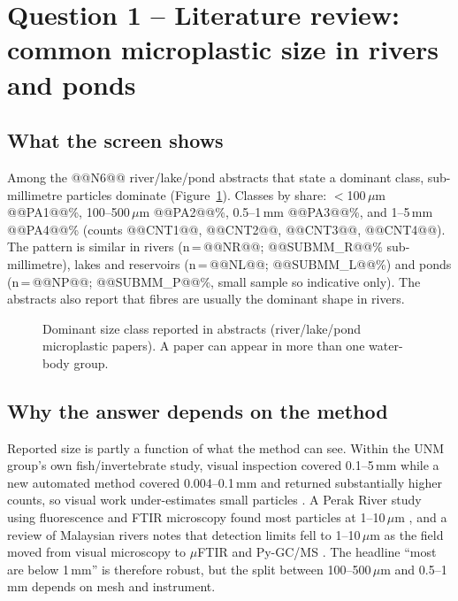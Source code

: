 \documentclass[11pt,a4paper]{article}
\newcommand{\um}{\,\ensuremath{\mu}m}
\begin{document}
\section{Question 1 -- Literature review: common microplastic size in rivers and ponds}
\subsection{What the screen shows}
Among the @@N6@@ river/lake/pond abstracts that state a dominant class, sub-millimetre particles dominate (Figure~\ref{fig:bars}). Classes by share: $<$100\um{} @@PA1@@\%, 100--500\um{} @@PA2@@\%, 0.5--1\,mm @@PA3@@\%, and 1--5\,mm @@PA4@@\% (counts @@CNT1@@, @@CNT2@@, @@CNT3@@, @@CNT4@@). The pattern is similar in rivers (n\,=\,@@NR@@; @@SUBMM_R@@\% sub-millimetre), lakes and reservoirs (n\,=\,@@NL@@; @@SUBMM_L@@\%) and ponds (n\,=\,@@NP@@; @@SUBMM_P@@\%, small sample so indicative only). The abstracts also report that fibres are usually the dominant shape in rivers.

\begin{figure}[H]\centering
{}
\caption{Dominant size class reported in abstracts (river/lake/pond microplastic papers). A paper can appear in more than one water-body group.}\label{fig:bars}
\end{figure}

\subsection{Why the answer depends on the method}
Reported size is partly a function of what the method can see. Within the UNM group's own fish/invertebrate study, visual inspection covered 0.1--5\,mm while a new automated method covered 0.004--0.1\,mm and returned substantially higher counts, so visual work under-estimates small particles \cite{ng24}. A Perak River study using fluorescence and FTIR microscopy found most particles at 1--10\um{} \cite{hassan25}, and a review of Malaysian rivers notes that detection limits fell to 1--10\um{} as the field moved from visual microscopy to $\mu$FTIR and Py-GC/MS \cite{bouida26}. The headline ``most are below 1\,mm'' is therefore robust, but the split between 100--500\um{} and 0.5--1\,mm depends on mesh and instrument.
\end{document}

